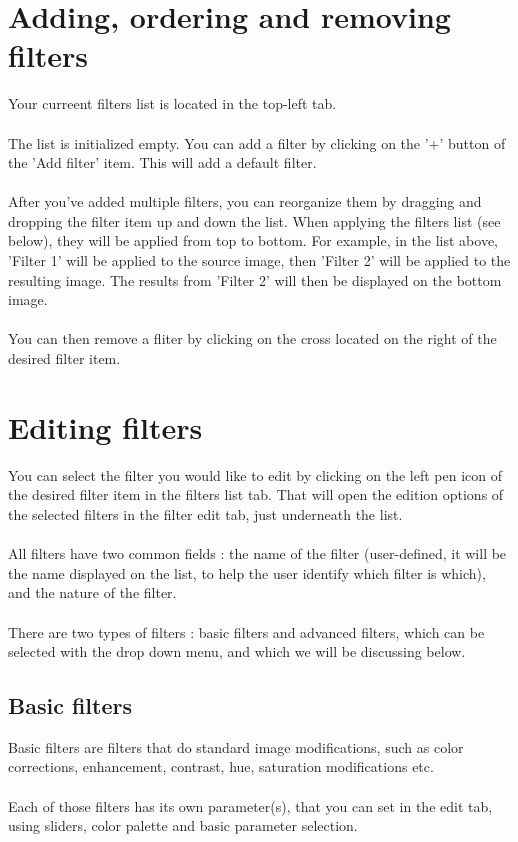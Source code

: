 \documentclass[12pt,a4paper]{article}
\begin{document}
\section{Adding, ordering and removing filters}

 Your curreent filters list is located in the top-left tab.\\
 ~\\
 The list is initialized empty. You can add a filter by clicking on the '+' button of the 'Add filter' item. This will add a default filter.\\
 ~\\
 After you've added multiple filters, you can reorganize them by dragging and dropping the filter item up and down the list. When applying the filters list (see below), they will be applied from top to bottom. For example, in the list above, 'Filter 1' will be applied to the source image, then 'Filter 2' will be applied to the resulting image. The results from 'Filter 2' will then be displayed on the bottom image.\\
 ~\\
 You can then remove a fliter by clicking on the cross located on the right of the desired filter item.
 
\section{Editing filters}

You can select the filter you would like to edit by clicking on the left pen icon of the desired filter item in the filters list tab. That will open the edition options of the selected filters in the filter edit tab, just underneath the list.\\
~\\
All filters have two common fields : the name of the filter (user-defined, it will be the name displayed on the list, to help the user identify which filter is which), and the nature of the filter.\\
~\\
There are two types of filters : basic filters and advanced filters, which can be selected with the drop down menu, and which we will be discussing below.

\subsection{Basic filters}

Basic filters are filters that do standard image modifications, such as color corrections, enhancement, contrast, hue, saturation modifications etc.\\
~\\
Each of those filters has its own parameter(s), that you can set in the edit tab, using sliders, color palette and basic parameter selection.
\end{document}
